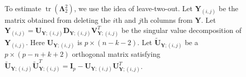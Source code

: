 \documentclass[12pt]{article} %
\DeclareMathOperator{\mytr}{tr}
\DeclareMathOperator{\myE}{E}
\DeclareMathOperator{\myVar}{Var}
\newcommand{\bY}{\mathbf{Y}}
\newcommand{\bI}{\mathbf{I}}
\newcommand{\bU}{\mathbf{U}}
\newcommand{\bD}{\mathbf{D}}
\newcommand{\bV}{\mathbf{V}}
\newcommand{\bfsym}[1]{\ensuremath{\boldsymbol{#1}}}
\def\bLambda {\bfsym {\Lambda}}
\def\bSigma {\bfsym {\Sigma}}
\newtheorem{proposition}{Proposition}
\theoremstyle{definition}
\begin{document}


 To estimate $\mytr(\bLambda_2^2)$,
    we use the idea of leave-two-out.
    Let $\bY_{(i,j)}$ be the matrix obtained from deleting the $i$th and $j$th columns from $\bY$.
    Let $\bY_{(i,j)}=\bU_{\bY;{(i,j)}}\bD_{\bY;{(i,j)}}\bV_{\bY;{(i,j)}}^T$ be the singular value decomposition of $\bY_{(i,j)}$.
    Here $\bU_{\bY;{(i,j)}}$ is $p\times (n-k-2)$.
    Let $\tilde{\bU}_{\bY;{(i,j)}}$ be a $p\times (p-n+k+2)$ orthogonal matrix satisfying $\tilde{\bU}_{\bY;{(i,j)}}\tilde{\bU}_{\bY;{(i,j)}}^T=\bI_{p}-\bU_{\bY;{(i,j)}}\bU_{\bY;{(i,j)}}^T$.
\end{document}
